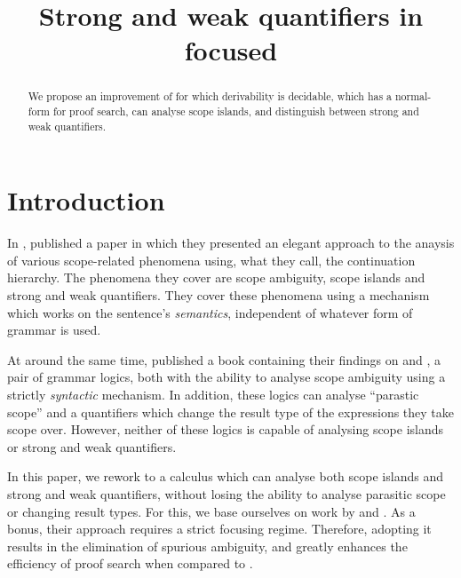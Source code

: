 \documentclass[10pt,a4paper]{llncs}
\begin{document}
\mainmatter%
\title{Strong and weak quantifiers in focused \NLCL}
\maketitle

\begin{abstract}
  We propose an improvement of  {\NLCL} for which
  derivability is decidable, which has a normal-form for proof search,
  can analyse scope islands, and distinguish between strong and weak
  quantifiers.
\end{abstract}

\section{Introduction}\label{sec:introduction}

In \citeyear{kiselyov2014}, \citet{kiselyov2014} published a
paper in which they presented an elegant approach to the anaysis of
various scope-related phenomena using, what they call, the
continuation hierarchy.
The phenomena they cover are scope ambiguity, scope islands and strong
and weak quantifiers.
They cover these phenomena using a mechanism which works on the
sentence's \emph{semantics}, independent of whatever form of grammar
is used.

At around the same time,  published a book
containing their findings on {\NLLAM} and {\NLCL}, a pair of grammar
logics, both with the ability to analyse scope ambiguity using a
strictly \emph{syntactic} mechanism.
In addition, these logics can analyse ``parastic scope''
\citep{barker2007,barker2015} and a quantifiers which change the
result type of the expressions they take scope over.
However, neither of these logics is capable of analysing scope islands
or strong and weak quantifiers.

In this paper, we rework {\NLCL} to a calculus which can analyse both
scope islands and strong and weak quantifiers, without losing
the ability to analyse parasitic scope or changing result types.
For this, we base ourselves on work by \citet{moortgat1996} and
\citet{moortgat2012}. As a bonus, their approach requires a strict
focusing regime. Therefore, adopting it results in the elimination of
spurious ambiguity, and greatly enhances the efficiency of proof
search when compared to  {\NLCL}.
\end{document}
